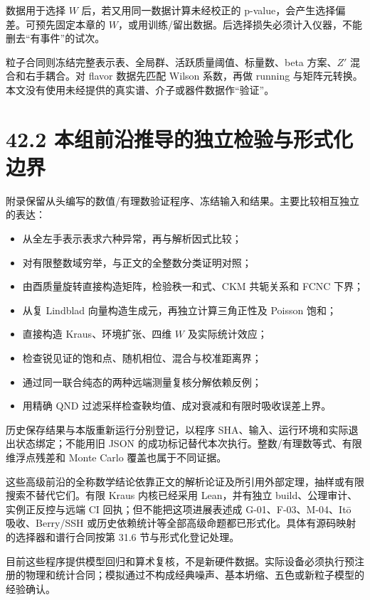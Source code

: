 \documentclass[
  11pt,
  oneside]{book}
\providecommand{\tightlist}{%
  \setlength{\itemsep}{0pt}\setlength{\parskip}{0pt}}
\begin{document}
数据用于选择 \(W\) 后，若又用同一数据计算未经校正的
p-value，会产生选择偏差。可预先固定本章的
\(W\)，或用训练/留出数据。后选择损失必须计入仪器，不能删去``有事件''的试次。

粒子合同则冻结完整表示表、全局群、活跃质量阈值、标量数、beta
方案、\(Z'\) 混合和右手耦合。对 flavor 数据先匹配 Wilson 系数，再做
running
与矩阵元转换。本文没有使用未经提供的真实谱、介子或器件数据作``验证''。

\section{42.2 本组前沿推导的独立检验与形式化边界}

附录保留从头编写的数值/有理数验证程序、冻结输入和结果。主要比较相互独立的表达：

\begin{itemize}
\tightlist
\item
  从全左手表示表求六种异常，再与解析因式比较；
\item
  对有限整数域穷举，与正文的全整数分类证明对照；
\item
  由酉质量旋转直接构造矩阵，检验秩一和式、CKM 共轭关系和 FCNC 下界；
\item
  从复 Lindblad 向量构造生成元，再独立计算三角正性及 Poisson 饱和；
\item
  直接构造 Kraus、环境扩张、四维 \(W\) 及实际统计效应；
\item
  检查锐见证的饱和点、随机相位、混合与校准距离界；
\item
  通过同一联合纯态的两种远端测量复核分解依赖反例；
\item
  用精确 QND 过滤采样检查鞅均值、成对衰减和有限时吸收误差上界。
\end{itemize}

历史保存结果与本版重新运行分别登记，以程序
SHA、输入、运行环境和实际退出状态绑定；不能用旧 JSON
的成功标记替代本次执行。整数/有理数等式、有限维浮点残差和 Monte Carlo
覆盖也属于不同证据。

这些高级前沿的全称数学结论依靠正文的解析论证及所引用外部定理，抽样或有限搜索不替代它们。有限
Kraus 内核已经采用 Lean，并有独立 build、公理审计、实例正反控与远端 CI
回执；但不能把这项进展表述成 G-01、F-03、M-04、Itō 吸收、Berry/SSH
或历史依赖统计等全部高级命题都已形式化。具体有源码映射的选择器和谱行合同按第
31.6 节与形式化登记处理。

目前这些程序提供模型回归和算术复核，不是新硬件数据。实际设备必须执行预注册的物理和统计合同；模拟通过不构成经典噪声、基本坍缩、五色或新粒子模型的经验确认。
\end{document}
